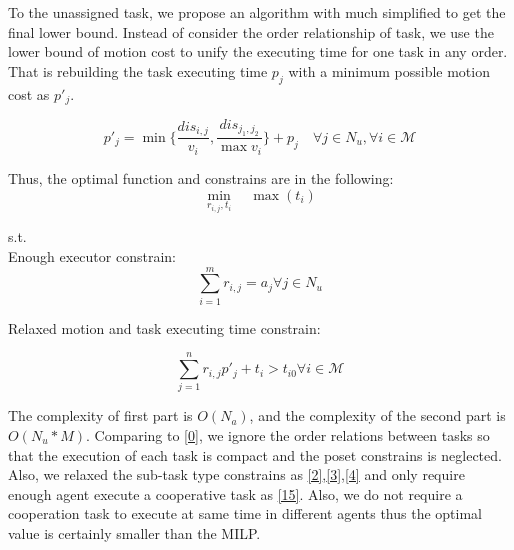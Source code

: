 To the unassigned task, we propose an algorithm with much simplified to get the final lower bound.
Instead of consider the order relationship of task, we use the lower bound of motion cost to unify
the executing time for one task in any order. That is rebuilding the task executing time $p_j$ with
a minimum possible motion cost as $p'_j$.

\begin{equation}
p'_j = \min{\{\frac{dis_{i,j}}{v_i}, \frac{dis_{j_1,j_2}}{\max{v_i}}\}}+p_j    \quad \forall j\in N_u, \forall i \in \mathcal{M}
\label{13}
\end{equation}

Thus, the optimal function and constrains are in the following:
\begin{equation}
\min_{r_{i,j},t_i} \quad \max(t_i)
\label{14}
\end{equation}

s.t.\\

Enough executor constrain:
\begin{equation}
  \sum_{i=1}^{m}r_{i,j} = a_{j}  \forall j \in N_u
  \label{15}
\end{equation}

Relaxed motion and task executing time constrain:

\begin{equation}
\sum_{j=1}^{n}r_{i,j}p'_j +t_i > t_{i0} \forall i \in \mathcal{M}
\label{16}
\end{equation}

The complexity of first part is $O(N_a)$, and the complexity of the second part is $O(N_u*M)$.
Comparing to \ref{0}, we ignore the order relations between tasks so that the execution of
each task is compact and the poset constrains is neglected. Also, we relaxed the sub-task type
constrains as \ref{2},\ref{3},\ref{4} and only require enough agent execute a cooperative task
as \ref{15}. Also, we do not require a cooperation task to execute at same time in different
agents thus the optimal value is certainly smaller than the MILP. 

